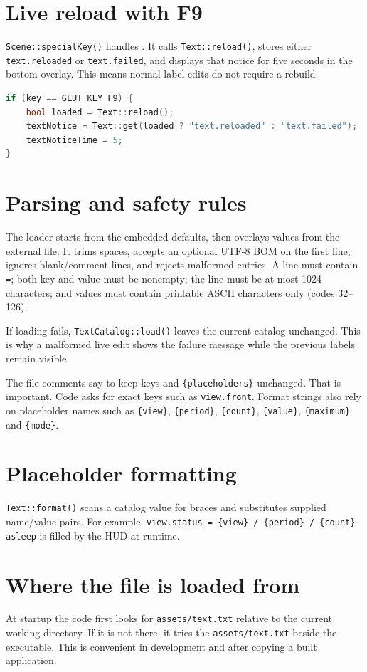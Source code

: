\documentclass[11pt,a4paper,openany]{book}
\newcommand{\code}[1]{\texttt{#1}}
\newcommand{\file}[1]{\nolinkurl{#1}}
\newcommand{\keycap}[1]{\begingroup\setlength{\fboxsep}{0.8pt}\raisebox{0.05ex}{\fbox{\footnotesize\texttt{#1}}}\endgroup}
\begin{document}
\section{Live reload with F9}
\code{Scene::specialKey()} handles \keycap{F9}. It calls \code{Text::reload()}, stores either \code{text.reloaded} or \code{text.failed}, and displays that notice for five seconds in the bottom overlay. This means normal label edits do not require a rebuild.

\begin{lstlisting}[language=C++]
if (key == GLUT_KEY_F9) {
    bool loaded = Text::reload();
    textNotice = Text::get(loaded ? "text.reloaded" : "text.failed");
    textNoticeTime = 5;
}
\end{lstlisting}

\section{Parsing and safety rules}
The loader starts from the embedded defaults, then overlays values from the external file. It trims spaces, accepts an optional UTF-8 BOM on the first line, ignores blank/comment lines, and rejects malformed entries. A line must contain \code{=}; both key and value must be nonempty; the line must be at most 1024 characters; and values must contain printable ASCII characters only (codes 32--126).

If loading fails, \code{TextCatalog::load()} leaves the current catalog unchanged. This is why a malformed live edit shows the failure message while the previous labels remain visible.

\begin{warningbox}
	The file comments say to keep keys and \code{\{placeholders\}} unchanged. That is important. Code asks for exact keys such as \code{view.front}. Format strings also rely on placeholder names such as \code{\{view\}}, \code{\{period\}}, \code{\{count\}}, \code{\{value\}}, \code{\{maximum\}} and \code{\{mode\}}.
\end{warningbox}

\section{Placeholder formatting}
\code{Text::format()} scans a catalog value for braces and substitutes supplied name/value pairs. For example, \code{view.status = \{view\} / \{period\} / \{count\} asleep} is filled by the HUD at runtime.

\section{Where the file is loaded from}
At startup the code first looks for \file{assets/text.txt} relative to the current working directory. If it is not there, it tries the \file{assets/text.txt} beside the executable. This is convenient in development and after copying a built application.
\end{document}
